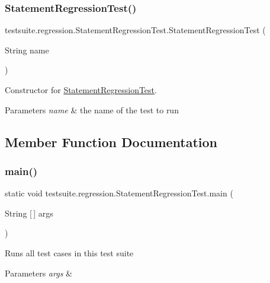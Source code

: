 \subsubsection{\texorpdfstring{Statement\+Regression\+Test()}{StatementRegressionTest()}}
{\footnotesize\ttfamily testsuite.\+regression.\+Statement\+Regression\+Test.\+Statement\+Regression\+Test (\begin{DoxyParamCaption}\item[{String}]{name }\end{DoxyParamCaption})}

Constructor for \mbox{\hyperlink{classtestsuite_1_1regression_1_1_statement_regression_test}{Statement\+Regression\+Test}}.


\begin{DoxyParams}{Parameters}
{\em name} & the name of the test to run \\
\hline
\end{DoxyParams}


\subsection{Member Function Documentation}
\mbox{\label{classtestsuite_1_1regression_1_1_statement_regression_test_a47cd85214f68ea331f0b16fcc90771a9}} 
\subsubsection{\texorpdfstring{main()}{main()}}
{\footnotesize\ttfamily static void testsuite.\+regression.\+Statement\+Regression\+Test.\+main (\begin{DoxyParamCaption}\item[{String \mbox{[}$\,$\mbox{]}}]{args }\end{DoxyParamCaption})\hspace{0.3cm}{\ttfamily [static]}}

Runs all test cases in this test suite


\begin{DoxyParams}{Parameters}
{\em args} & \\
\hline
\end{DoxyParams}
\mbox{\label{classtestsuite_1_1regression_1_1_statement_regression_test_a662e79a8152a1c9cefcfde5ea2a7c046}} 
